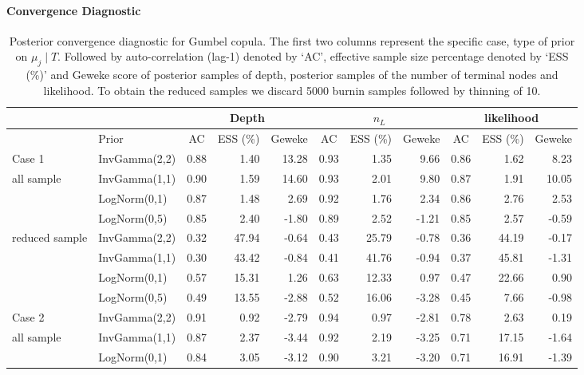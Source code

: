 \documentclass{amsart}
\begin{document}
\paragraph{Convergence Diagnostic}
\begin{table}[ht]
	\centering
	\caption{Posterior convergence diagnostic for Gumbel copula. The first two columns represent the specific case, type of prior on $\mu_j\mid T$. Followed by auto-correlation (lag-1) denoted by `AC', effective sample size percentage denoted by `ESS (\%)' and Geweke score of posterior samples of depth, posterior samples of the number of terminal nodes and likelihood. To obtain the reduced samples we discard 5000 burnin samples followed by thinning of 10.}
	\scriptsize{
		\begin{tabular}{ll|crr|crr|crr}
			\toprule
		\multicolumn{2}{c|}{} &
		\multicolumn{3}{c|}{Depth} &
		\multicolumn{3}{c|}{$n_L$} &
		\multicolumn{3}{c}{likelihood} \\
		\midrule
		& Prior & AC & ESS (\%) & Geweke & AC & ESS (\%) & Geweke & AC & ESS (\%) & Geweke \\ 
			\midrule
			Case 1 & InvGamma(2,2) & 0.88 & 1.40 & 13.28 & 0.93 & 1.35 & 9.66 & 0.86 & 1.62 & 8.23 \\ 
			all sample & InvGamma(1,1) & 0.90 & 1.59 & 14.60 & 0.93 & 2.01 & 9.80 & 0.87 & 1.91 & 10.05 \\ 
			& LogNorm(0,1) & 0.87 & 1.48 & 2.69 & 0.92 & 1.76 & 2.34 & 0.86 & 2.76 & 2.53 \\ 
			& LogNorm(0,5) & 0.85 & 2.40 & -1.80 & 0.89 & 2.52 & -1.21 & 0.85 & 2.57 & -0.59 \\ 
			\midrule
			reduced sample & InvGamma(2,2) & 0.32 & 47.94 & -0.64 & 0.43 & 25.79 & -0.78 & 0.36 & 44.19 & -0.17 \\ 
			& InvGamma(1,1) & 0.30 & 43.42 & -0.84 & 0.41 & 41.76 & -0.94 & 0.37 & 45.81 & -1.31 \\ 
			& LogNorm(0,1) & 0.57 & 15.31 & 1.26 & 0.63 & 12.33 & 0.97 & 0.47 & 22.66 & 0.90 \\ 
			& LogNorm(0,5) & 0.49 & 13.55 & -2.88 & 0.52 & 16.06 & -3.28 & 0.45 & 7.66 & -0.98 \\ 
			\midrule
			Case 2 & InvGamma(2,2) & 0.91 & 0.92 & -2.79 & 0.94 & 0.97 & -2.81 & 0.78 & 2.63 & 0.19 \\ 
			all sample & InvGamma(1,1) & 0.87 & 2.37 & -3.44 & 0.92 & 2.19 & -3.25 & 0.71 & 17.15 & -1.64 \\ 
			& LogNorm(0,1) & 0.84 & 3.05 & -3.12 & 0.90 & 3.21 & -3.20 & 0.71 & 16.91 & -1.39 \\ 

\end{tabular}}
\end{table}
\end{document}
